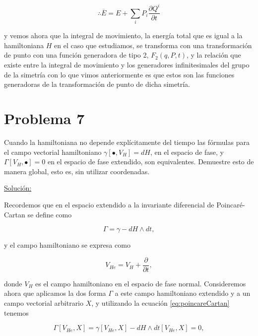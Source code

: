 \documentclass[a4paper,10pt]{article}
\numberwithin{equation}{section}
\begin{document}
\begin{equation}
 \therefore \overline{E} = E + \sum_i P_i \frac{\partial Q^i}{\partial t}
\end{equation}

y vemos ahora que la integral de movimiento, la energía total que es igual a la hamiltoniana $H$ en el caso 
que estudiamos, se transforma con una transformación de punto con una función generadora 
de tipo 2, $F_2(q,P,t)$, y la relación que existe entre la integral de movimiento y 
los generadores infinitesimales del grupo de la simetría con lo que vimos anteriormente 
es que estos son las funciones generadoras de la transformación de punto de dicha 
simetría. 

\section{Problema 7}

Cuando la hamiltoniana no depende explícitamente del tiempo las fórmulas para el 
campo vectorial hamiltoniano $\gamma[\bullet,V_H] = dH$, en el espacio de fase, 
y $\Gamma[V_H,\bullet] = 0$ en el espacio de fase extendido, son equivalentes. 
Demuestre esto de manera global, esto es, sin utilizar coordenadas.

\vspace{.3cm}

\underline{Solución:} \vspace{.3cm}

Recordemos que en el espacio extendido a la invariante diferencial de Poincaré-Cartan 
se define como

\begin{equation}
 \Gamma = \gamma - dH \wedge dt,
 \label{eq:poincareCartan}
\end{equation}

y el campo hamiltoniano se expresa como 

\begin{equation}
 V_{He} = V_H + \frac{\partial}{\partial t},
 \label{eq:campoHamiltonianoExt}
\end{equation}

donde $V_H$ es el campo hamiltoniano en el espacio de fase normal. Consideremos ahora 
que aplicamos la dos forma $\Gamma$ a este campo hamiltoniano extendido y a un campo 
vectorial arbitrario $X$, y utilizando la ecuación \eqref{eq:poincareCartan} tenemos 

\begin{equation}
 \Gamma[V_{He},X] = \gamma[V_{He},X] - dH \wedge dt[V_{He},X] = 0,
 \label{eq:equivalencia}
\end{equation}
\end{document}
